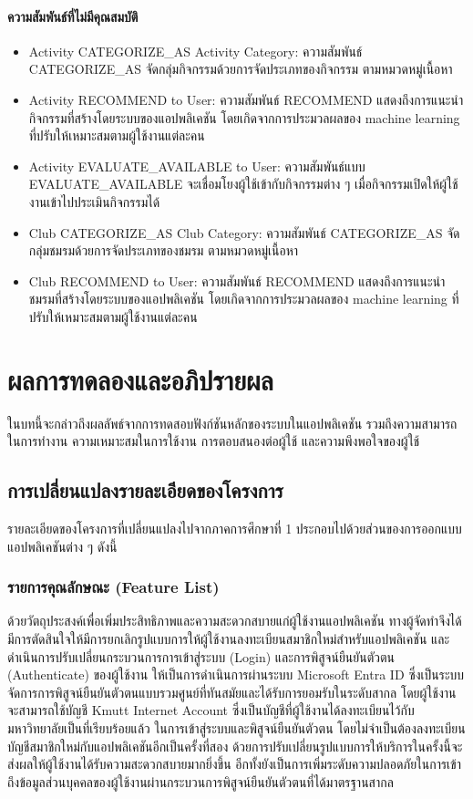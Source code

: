 \documentclass[14pt,oneside,openright,a4paper]{cpe-thai-project}
\begin{document}
      \subsubsection{ความสัมพันธ์ที่ไม่มีคุณสมบัติ}
        \normalsize
        \begin{itemize}
          \item Activity CATEGORIZE\_AS Activity Category: ความสัมพันธ์ CATEGORIZE\_AS จัดกลุ่มกิจกรรมด้วยการจัดประเภทของกิจกรรม ตามหมวดหมู่เนื้อหา
          \item Activity RECOMMEND to User: ความสัมพันธ์ RECOMMEND แสดงถึงการแนะนำกิจกรรมที่สร้างโดยระบบของแอปพลิเคชัน โดยเกิดจากการประมวลผลของ machine learning ที่ปรับให้เหมาะสมตามผู้ใช้งานแต่ละคน
          \item Activity EVALUATE\_AVAILABLE to User: ความสัมพันธ์แบบ EVALUATE\_AVAILABLE จะเชื่อมโยงผู้ใช้เข้ากับกิจกรรมต่าง ๆ เมื่อกิจกรรมเปิดให้ผู้ใช้งานเข้าไปประเมินกิจกรรมได้
          \item Club CATEGORIZE\_AS Club Category: ความสัมพันธ์ CATEGORIZE\_AS จัดกลุ่มชมรมด้วยการจัดประเภทของชมรม ตามหมวดหมู่เนื้อหา
          \item Club RECOMMEND to User: ความสัมพันธ์ RECOMMEND แสดงถึงการแนะนำชมรมที่สร้างโดยระบบของแอปพลิเคชัน โดยเกิดจากการประมวลผลของ machine learning ที่ปรับให้เหมาะสมตามผู้ใช้งานแต่ละคน
        \end{itemize}
\chapter{ผลการทดลองและอภิปรายผล} 
ในบทนี้จะกล่าวถึงผลลัพธ์จากการทดสอบฟังก์ชันหลักของระบบในแอปพลิเคชัน รวมถึงความสามารถในการทำงาน ความเหมาะสมในการใช้งาน การตอบสนองต่อผู้ใช้ และความพึงพอใจของผู้ใช้
\section{การเปลี่ยนแปลงรายละเอียดของโครงการ}
รายละเอียดของโครงการที่เปลี่ยนแปลงไปจากภาคการศึกษาที่ 1 ประกอบไปด้วยส่วนของการออกแบบแอปพลิเคชันต่าง ๆ ดังนี้
 \subsection{รายการคุณลักษณะ (Feature List)}\label{subsec:editedfeaturelist}
 ด้วยวัตถุประสงค์เพื่อเพิ่มประสิทธิภาพและความสะดวกสบายแก่ผู้ใช้งานแอปพลิเคชัน ทางผู้จัดทำจึงได้มีการตัดสินใจให้มีการยกเลิกรูปแบบการให้ผู้ใช้งานลงทะเบียนสมาชิกใหม่สำหรับแอปพลิเคชัน และดำเนินการปรับเปลี่ยนกระบวนการการเข้าสู่ระบบ (Login) และการพิสูจน์ยืนยันตัวตน (Authenticate) ของผู้ใช้งาน
 ให้เป็นการดำเนินการผ่านระบบ Microsoft Entra ID ซึ่งเป็นระบบจัดการการพิสูจน์ยืนยันตัวตนแบบรวมศูนย์ที่ทันสมัยและได้รับการยอมรับในระดับสากล โดยผู้ใช้งานจะสามารถใช้บัญชี Kmutt Internet Account ซึ่งเป็นบัญชีที่ผู้ใช้งานได้ลงทะเบียนไว้กับมหาวิทยาลัยเป็นที่เรียบร้อยแล้ว 
 ในการเข้าสู่ระบบและพิสูจน์ยืนยันตัวตน โดยไม่จำเป็นต้องลงทะเบียนบัญชีสมาชิกใหม่กับแอปพลิเคชันอีกเป็นครั้งที่สอง ด้วยการปรับเปลี่ยนรูปแบบการให้บริการในครั้งนี้จะส่งผลให้ผู้ใช้งานได้รับความสะดวกสบายมากยิ่งขึ้น อีกทั้งยังเป็นการเพิ่มระดับความปลอดภัยในการเข้าถึงข้อมูลส่วนบุคคลของผู้ใช้งานผ่านกระบวนการพิสูจน์ยืนยันตัวตนที่ได้มาตรฐานสากล
\end{document}

